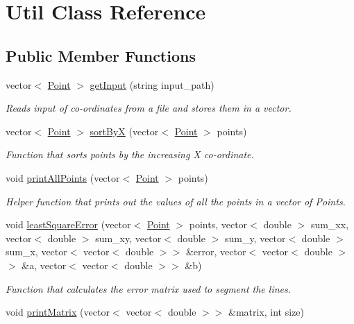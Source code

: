 \hypertarget{classUtil}{}\section{Util Class Reference}
\label{classUtil}
\subsection*{Public Member Functions}
\begin{DoxyCompactItemize}
\item 
vector$<$ \hyperlink{classPoint}{Point} $>$ \hyperlink{classUtil_a9d498a3fdcb57063895cd379f125e36c}{get\+Input} (string input\+\_\+path)
\begin{DoxyCompactList}\small\item\em Reads input of co-\/ordinates from a file and stores them in a vector. \end{DoxyCompactList}\item 
vector$<$ \hyperlink{classPoint}{Point} $>$ \hyperlink{classUtil_a088daf5e054cfe08139bdccd00f58cb5}{sort\+ByX} (vector$<$ \hyperlink{classPoint}{Point} $>$ points)
\begin{DoxyCompactList}\small\item\em Function that sorts points by the increasing X co-\/ordinate. \end{DoxyCompactList}\item 
void \hyperlink{classUtil_a178628de18adc2807d3a331a060e62a0}{print\+All\+Points} (vector$<$ \hyperlink{classPoint}{Point} $>$ points)
\begin{DoxyCompactList}\small\item\em Helper function that prints out the values of all the points in a vector of Points. \end{DoxyCompactList}\item 
void \hyperlink{classUtil_a770bc482b540591e2aeb53cbd714dc7f}{least\+Square\+Error} (vector$<$ \hyperlink{classPoint}{Point} $>$ points, vector$<$ double $>$ sum\+\_\+xx, vector$<$ double $>$ sum\+\_\+xy, vector$<$ double $>$ sum\+\_\+y, vector$<$ double $>$ sum\+\_\+x, vector$<$ vector$<$ double $>$$>$ \&error, vector$<$ vector$<$ double $>$$>$ \&a, vector$<$ vector$<$ double $>$$>$ \&b)
\begin{DoxyCompactList}\small\item\em Function that calculates the error matrix used to segment the lines. \end{DoxyCompactList}\item 
void \hyperlink{classUtil_a28d918079aea7f09487b7636f8fd4c1e}{print\+Matrix} (vector$<$ vector$<$ double $>$$>$ \&matrix, int size)

\end{DoxyCompactItemize}
